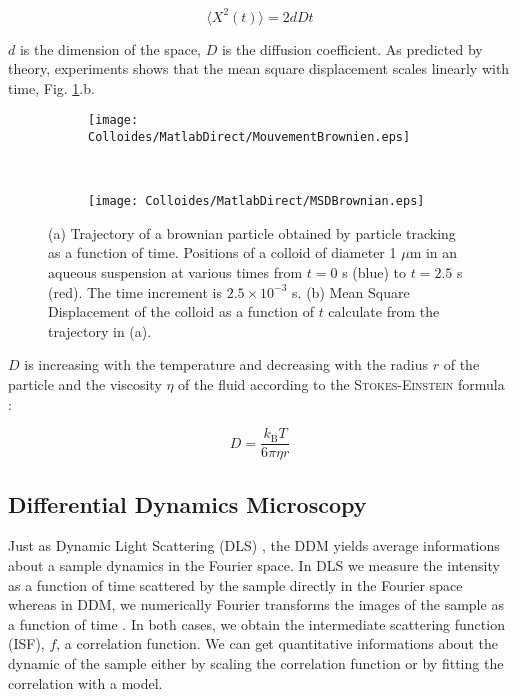 \documentclass[%
 aip,
 jmp,%
 amsmath,amssymb,
reprint,%
]{revtex4-1}
\begin{document}
\begin{equation}
\langle X^2(t) \rangle = 2dDt
\end{equation}

$d$ is the dimension of the space, $D$ is the diffusion coefficient. As predicted by theory, experiments shows that the mean square displacement scales linearly with time, Fig. \ref{BrownianTrajectory}.b.

\begin{figure}[H]
	\begin{subfigure}[b]{\linewidth}
		\centering
		\texttt{[image: Colloides/MatlabDirect/MouvementBrownien.eps]}		
	\end{subfigure}
	\\
	\begin{subfigure}[b]{\linewidth}
		\centering
		\texttt{[image: Colloides/MatlabDirect/MSDBrownian.eps]}
	\end{subfigure}
	\caption{(a) Trajectory of a brownian particle obtained by particle tracking as a function of time. Positions of a colloid of diameter 1 $\mu$m in an aqueous suspension at various times from $t=0$ s (blue) to $t=2.5$ s (red). The time increment is $2.5 \times 10^{-3}$ s. (b) Mean Square Displacement of the colloid as a function of $t$ calculate from the trajectory in (a). }
	\label{BrownianTrajectory}
\end{figure}

$D$ is increasing with the temperature and decreasing with the radius $r$ of the particle and the viscosity $\eta$ of the fluid according to the \textsc{Stokes-Einstein} formula \citep{9_einstein1906theory}:

\begin{equation}
D = \frac{k_\text{B} T}{6 \pi \eta r}
\end{equation}


\subsection{Differential Dynamics Microscopy}

Just as Dynamic Light Scattering (DLS) \citep{18_sartor2003dynamic}, the DDM yields average informations about a sample dynamics in the Fourier space. In DLS we measure the intensity as a function of time scattered by the sample directly in the Fourier space whereas in  DDM, we numerically Fourier transforms the images of the sample as a function of time \citep{2_DDM}. In both cases, we obtain the intermediate scattering function (ISF), $f$, a correlation function. We can get quantitative informations about the dynamic of the sample either by scaling the correlation function or by fitting the correlation with a model.
\end{document}
